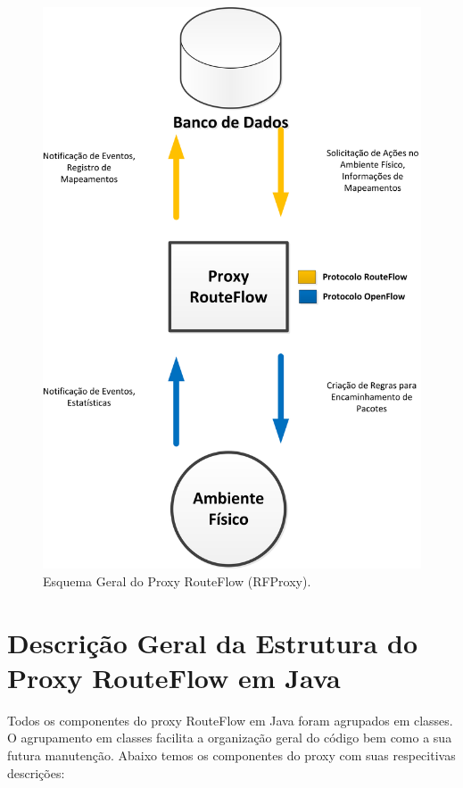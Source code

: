 \begin{figure}[h] 
\centering
\includegraphics[width=120mm]{esquematico_geral_proxy.png}
\caption{Esquema Geral do Proxy RouteFlow (RFProxy).}
\label{fig:esquematicoProxy} 
\end{figure}
 

\section{Descrição Geral da Estrutura do Proxy RouteFlow em Java}

Todos os componentes do proxy RouteFlow em Java foram agrupados em classes. O agrupamento em classes 
facilita a 
organização geral do código bem como a sua futura manutenção. Abaixo temos os componentes do proxy com 
suas respecitivas descrições:

